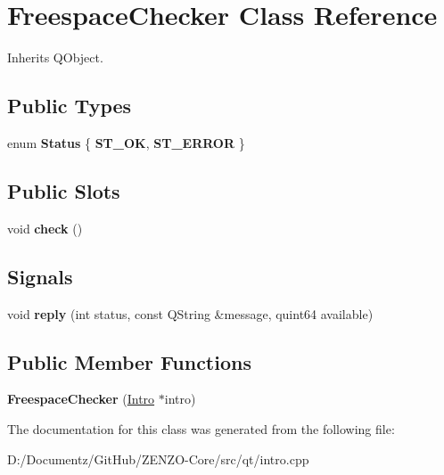 \hypertarget{class_freespace_checker}{}\section{Freespace\+Checker Class Reference}
\label{class_freespace_checker}


Inherits Q\+Object.

\subsection*{Public Types}
\begin{DoxyCompactItemize}
\item 
\mbox{\label{class_freespace_checker_ac049779e76e197b16694f783eea84704}} 
enum {\bfseries Status} \{ {\bfseries S\+T\+\_\+\+OK}, 
{\bfseries S\+T\+\_\+\+E\+R\+R\+OR}
 \}
\end{DoxyCompactItemize}
\subsection*{Public Slots}
\begin{DoxyCompactItemize}
\item 
\mbox{\label{class_freespace_checker_afb1648f73f72526df2dc0a25e047bbfd}} 
void {\bfseries check} ()
\end{DoxyCompactItemize}
\subsection*{Signals}
\begin{DoxyCompactItemize}
\item 
\mbox{\label{class_freespace_checker_add7c87cc71950e7dfd315e4d17efe72c}} 
void {\bfseries reply} (int status, const Q\+String \&message, quint64 available)
\end{DoxyCompactItemize}
\subsection*{Public Member Functions}
\begin{DoxyCompactItemize}
\item 
\mbox{\label{class_freespace_checker_a3b09323069e9e4306b4cdaed2852e0d8}} 
{\bfseries Freespace\+Checker} (\mbox{\hyperlink{class_intro}{Intro}} $\ast$intro)
\end{DoxyCompactItemize}


The documentation for this class was generated from the following file\+:\begin{DoxyCompactItemize}
\item 
D\+:/\+Documentz/\+Git\+Hub/\+Z\+E\+N\+Z\+O-\/\+Core/src/qt/intro.\+cpp\end{DoxyCompactItemize}

